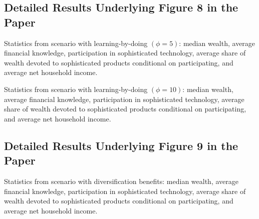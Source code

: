 \documentclass[10pt, oneside]{article}   	%
\begin{document}
\pagebreak

\subsection*{Detailed Results Underlying Figure 8 in the Paper}

\begin{table}[H]
\centering

\caption{Statistics from scenario with learning-by-doing $(\phi = 5)$: median wealth, average financial knowledge, participation in sophisticated technology, average share of wealth devoted to sophisticated products conditional on participating, and  average net household income.}
\end{table}

\begin{table}[H]
\centering

\caption{Statistics from scenario with learning-by-doing $(\phi = 10)$: median wealth, average financial knowledge, participation in sophisticated technology, average share of wealth devoted to sophisticated products conditional on participating, and average net household income.}
\end{table}




\pagebreak

\subsection*{Detailed Results Underlying Figure 9 in the Paper}

\begin{table}[H]
\centering

\caption{Statistics from scenario with diversification benefits: median wealth, average financial knowledge, participation in sophisticated technology, average share of wealth devoted to sophisticated products conditional on participating, and average net household income.}
\end{table}
\end{document}
